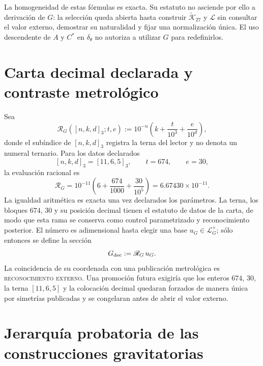 La homogeneidad de estas fórmulas es exacta. Su estatuto no asciende por ello
a derivación de \(G\): la selección queda abierta hasta construir
\(\widetilde{\mathcal K}_{27}\) y \(\mathscr L\) sin consultar el valor
externo, demostrar su naturalidad y fijar una normalización única. El uso
descendente de \(A\) y \(C^\ast\) en \(\delta_\theta\) no autoriza a utilizar
\(G\) para redefinirlos.

\section{Carta decimal declarada y contraste metrológico}
\label{sec:lector-decimal-independiente-G}

Sea
\[
 \mathscr R_G([n,k,d]_3;t,e)
 :=10^{-n}\left(k+\frac{t}{10^3}+\frac{e}{10^d}\right),
\]
donde el subíndice de \([n,k,d]_3\) registra la terna del lector y no denota
un numeral ternario. Para los datos declarados
\[
 [n,k,d]_3=[11,6,5]_3,\qquad t=674,\qquad e=30,
\]
la evaluación racional es
\[
 \boxed{
 \mathscr R_G
 =10^{-11}\left(6+\frac{674}{1000}+\frac{30}{10^5}\right)
 =6.67430\times10^{-11}.}
\]
La igualdad aritmética es exacta una vez declarados los parámetros. La terna,
los bloques \(674\), \(30\) y su posición decimal tienen el estatuto de datos
de la carta, de modo que esta rama se conserva como control parametrizado y
reconocimiento posterior. El número es adimensional hasta elegir una base
\(u_G\in\mathcal L_G^+\); sólo entonces se define la sección
\[
 G_{\rm dec}:=\mathscr R_G\,u_G.
\]
La coincidencia de su coordenada con una publicación metrológica es
\textsc{reconocimiento externo}. Una promoción futura exigiría que los enteros
\(674\), \(30\), la terna \([11,6,5]\) y la colocación decimal quedaran
forzados de manera única por simetrías publicadas y se congelaran antes de
abrir el valor externo.

\section{Jerarquía probatoria de las construcciones gravitatorias}
\label{sec:cuadrado-contraste-G}

